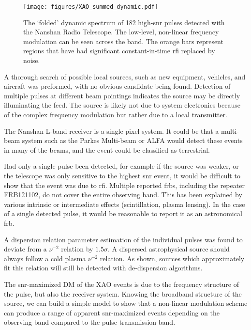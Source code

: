 \documentclass[a4paper,fleqn,usenatbib]{mnras}
\begin{document}
\begin{figure}
    \texttt{[image: figures/XAO\_summed\_dynamic.pdf]}
    \caption{The `folded' dynamic spectrum of 182 high-\gls{snr} pulses detected
    with the Nanshan Radio Telescope.  The low-level, non-linear frequency
    modulation can be seen across the band. The orange bars represent regions
    that have had significant constant-in-time \gls{rfi} replaced by noise.
    }
    \label{fig:xao_summed}
\end{figure}

A thorough search of possible local sources, such as new equipment, vehicles,
and aircraft was preformed, with no obvious candidate being found. Detection of
multiple pulses at different beam pointings indicates the source may be directly
illuminating the feed. The source is likely not due to system electronics
because of the complex frequency modulation but rather due to a local
transmitter.

The Nanshan L-band receiver is a single pixel system. It could be that a
multi-beam system such as the Parkes Multi-beam or ALFA would detect these
events in many of the beams, and the event could be classified as terrestrial.

Had only a single pulse been detected, for example if the source was weaker, or
the telescope was only sensitive to the highest \gls{snr} event, it would be
difficult to show that the event was due to \gls{rfi}.  Multiple reported
\glspl{frb}, including the repeater FRB121102, do not cover the entire observing
band. This has been explained by various intrinsic or intermediate effects
(scintillation, plasma lensing). In the case of a single detected pulse, it would
be reasonable to report it as an astronomical \gls{frb}.

A dispersion relation parameter estimation of the individual pulses was found to
deviate from a $\nu^{-2}$ relation by $1.5 \sigma$. A dispersed astrophysical
source should always follow a cold plasma $\nu^{-2}$ relation. As shown, sources
which approximately fit this relation will still be detected with de-dispersion
algorithms.

The \gls{snr}-maximized DM of the XAO events is due to the frequency structure
of the pulse, but also the receiver system.  Knowing the broadband structure of
the source, we can build a simple model to show that a non-linear modulation
scheme can produce a range of apparent \gls{snr}-maximized events depending on
the observing band compared to the pulse transmission band.
\end{document}
